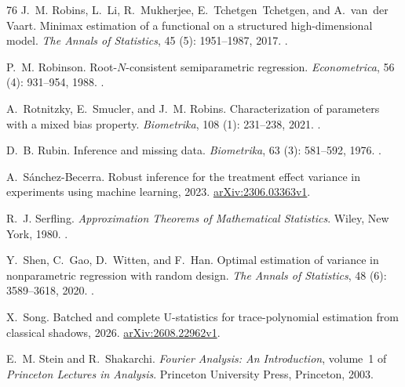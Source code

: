 \documentclass[12pt,oneside,openany]{book}
\numberwithin{equation}{chapter}
\theoremstyle{plain}
\theoremstyle{definition}
\theoremstyle{remark}
\begin{document}
\begin{thebibliography}{76}
J.~M. Robins, L.~Li, R.~Mukherjee, E.~Tchetgen~Tchetgen, and A.~van~der Vaart.
\newblock Minimax estimation of a functional on a structured high-dimensional
  model.
\newblock \emph{The Annals of Statistics}, 45 (5):
  1951--1987, 2017.
\newblock {}.

P.~M. Robinson.
\newblock Root-{$N$}-consistent semiparametric regression.
\newblock \emph{Econometrica}, 56 (4): 931--954, 1988.
\newblock {}.

A.~Rotnitzky, E.~Smucler, and J.~M. Robins.
\newblock Characterization of parameters with a mixed bias property.
\newblock \emph{Biometrika}, 108 (1): 231--238, 2021.
\newblock {}.

D.~B. Rubin.
\newblock Inference and missing data.
\newblock \emph{Biometrika}, 63 (3): 581--592, 1976.
\newblock {}.

A.~S{\'a}nchez-Becerra.
\newblock Robust inference for the treatment effect variance in experiments
  using machine learning, 2023.
\newblock \href{https://arxiv.org/abs/2306.03363v1}{arXiv:2306.03363v1}.

R.~J. Serfling.
\newblock \emph{Approximation Theorems of Mathematical Statistics}.
\newblock Wiley, New York, 1980.
\newblock {}.

Y.~Shen, C.~Gao, D.~Witten, and F.~Han.
\newblock Optimal estimation of variance in nonparametric regression with
  random design.
\newblock \emph{The Annals of Statistics}, 48 (6):
  3589--3618, 2020.
\newblock {}.

X.~Song.
\newblock Batched and complete {U}-statistics for trace-polynomial estimation
  from classical shadows, 2026.
\newblock \href{https://arxiv.org/abs/2608.22962v1}{arXiv:2608.22962v1}.

E.~M. Stein and R.~Shakarchi.
\newblock \emph{Fourier Analysis: An Introduction}, volume~1 of \emph{Princeton
  Lectures in Analysis}.
\newblock Princeton University Press, Princeton, 2003.


\end{thebibliography}
\end{document}
